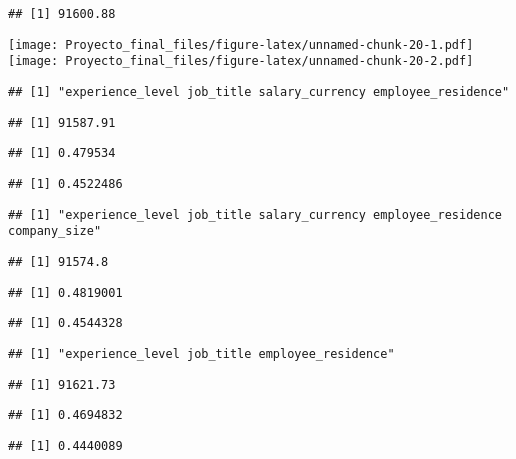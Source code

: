\documentclass[
]{article}
\begin{document}
\begin{verbatim}
## [1] 91600.88
\end{verbatim}

\texttt{[image: Proyecto\_final\_files/figure-latex/unnamed-chunk-20-1.pdf]}
\texttt{[image: Proyecto\_final\_files/figure-latex/unnamed-chunk-20-2.pdf]}

\begin{verbatim}
## [1] "experience_level job_title salary_currency employee_residence"
\end{verbatim}

\begin{verbatim}
## [1] 91587.91
\end{verbatim}

\begin{verbatim}
## [1] 0.479534
\end{verbatim}

\begin{verbatim}
## [1] 0.4522486
\end{verbatim}

\begin{verbatim}
## [1] "experience_level job_title salary_currency employee_residence company_size"
\end{verbatim}

\begin{verbatim}
## [1] 91574.8
\end{verbatim}

\begin{verbatim}
## [1] 0.4819001
\end{verbatim}

\begin{verbatim}
## [1] 0.4544328
\end{verbatim}

\begin{verbatim}
## [1] "experience_level job_title employee_residence"
\end{verbatim}

\begin{verbatim}
## [1] 91621.73
\end{verbatim}

\begin{verbatim}
## [1] 0.4694832
\end{verbatim}

\begin{verbatim}
## [1] 0.4440089
\end{verbatim}
\end{document}
